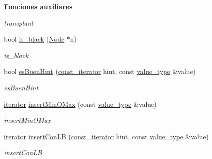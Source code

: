 \begin{Indent}{\bf Funciones auxiliares}
\begin{DoxyCompactItemize}
\begin{DoxyCompactList}\small\item\em transplant \end{DoxyCompactList}\item 
bool \hyperlink{classaed2_1_1map_aa749744eb0e858c97ac1571d49925012_aa749744eb0e858c97ac1571d49925012}{is\+\_\+black} (\hyperlink{structaed2_1_1map_1_1Node}{Node} $\ast$n)
\begin{DoxyCompactList}\small\item\em is\+\_\+black \end{DoxyCompactList}\item 
bool \hyperlink{classaed2_1_1map_a5890f3a706f415c8b47032a6d85e6582_a5890f3a706f415c8b47032a6d85e6582}{es\+Buen\+Hint} (\hyperlink{classaed2_1_1map_1_1const__iterator}{const\+\_\+iterator} hint, const \hyperlink{classaed2_1_1map_a719db98e0ff9a837610f76be33264680_a719db98e0ff9a837610f76be33264680}{value\+\_\+type} \&value)
\begin{DoxyCompactList}\small\item\em es\+Buen\+Hint \end{DoxyCompactList}\item 
\hyperlink{classaed2_1_1map_1_1iterator}{iterator} \hyperlink{classaed2_1_1map_a9128f5099069eef8876464c1651e3237_a9128f5099069eef8876464c1651e3237}{insert\+Min\+O\+Max} (const \hyperlink{classaed2_1_1map_a719db98e0ff9a837610f76be33264680_a719db98e0ff9a837610f76be33264680}{value\+\_\+type} \&value)
\begin{DoxyCompactList}\small\item\em insert\+Min\+O\+Max \end{DoxyCompactList}\item 
\hyperlink{classaed2_1_1map_1_1iterator}{iterator} \hyperlink{classaed2_1_1map_a3b746c7ef52bcc3e2073c7494a390730_a3b746c7ef52bcc3e2073c7494a390730}{insert\+Con\+LB} (\hyperlink{classaed2_1_1map_1_1const__iterator}{const\+\_\+iterator} hint, const \hyperlink{classaed2_1_1map_a719db98e0ff9a837610f76be33264680_a719db98e0ff9a837610f76be33264680}{value\+\_\+type} \&value)
\begin{DoxyCompactList}\small\item\em insert\+Con\+LB \end{DoxyCompactList}\end{DoxyCompactItemize}
\end{Indent}
